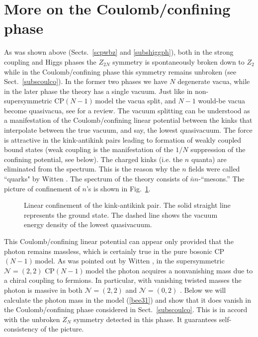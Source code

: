 \documentclass[epsfig,12pt]{article}
\newcommand{\cpn}{CP$(N-1)\,$}
\newcommand{\ntwot}{${\mathcal N}= \left(2,2\right) $ }
\newcommand{\ntwoo}{${\mathcal N}= \left(0,2\right) $ }
\begin{document}
{\section{More on the Coulomb/confining phase}
\label{moccp}
\setcounter{equation}{0}

As was shown above (Sects.~\ref{scpwbz} and \ref{subshiggph}), both in the strong coupling  and Higgs phases  
the $Z_{2N}$ symmetry is spontaneously broken down to $Z_2$ while in the Coulomb/confining phase this
symmetry remains unbroken (see Sect.~\ref{subscoulco}). In the former two phases we have $N$ degenerate vacua,
while in the later phase the theory has a single vacuum. Just like in non-supersymmetric
\cpn model \cite{GSY05} the vacua   split,  and $N-1$ would-be
vacua become quasivacua, see \cite{SYrev}
for a review. The vacuum splitting can be understood as a manifestation of the Coulomb/confining linear
potential between the kinks \cite{Coleman,W79} that interpolate between the true vacuum, and say,
the lowest quasivacuum. The force is attractive in the kink-antikink pairs leading to  formation
of weakly coupled bound states (weak coupling is the
manifestation of the $1/N$ suppression of the confining potential, see below).
The charged kinks (i.e. the $n$ quanta) are eliminated from the spectrum. This is the reason
why the
$n$ fields were called ``quarks" by Witten \cite{W79}. The spectrum
of the theory consists of $\bar{n} n$-``mesons.'' The picture of
confinement of $n$'s is shown in Fig.~\ref{fig:conf}.

\begin{figure}
\epsfxsize=8cm
\centerline{}
\caption{\small 
Linear confinement of the kink-antikink pair.
The solid straight line represents the ground state.
The dashed line shows
the vacuum energy density of the lowest quasivacuum.}
\label{fig:conf}
\end{figure}

This Coulomb/confining linear potential can appear only provided that the photon remains massless,
which is certainly true in the pure bosonic \cpn model. As was pointed out by Witten \cite{W79},
in the supersymmetric \ntwot \cpn model the photon  acquires a nonvanishing
mass due to a chiral coupling to fermions.
In particular, with vanishing twisted masses the photon is massive in both \ntwot \cite{W79} and
\ntwoo \cite{SYhet}. Below we will calculate the photon mass in the model (\ref{bee31}) and
show that it does vanish in the Coulomb/confining phase considered in Sect.~\ref{subscoulco}.
This is in accord with the unbroken $Z_N$ symmetry detected in this phase. It guarantees self-consistency
of the picture.

}
\end{document}
